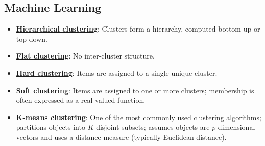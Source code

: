 \documentclass{article}%
\begin{document}
\subsection{Machine Learning}%
\label{subsec:MachineLearning}%
\begin{itemize}[leftmargin=*]%
\item \href{https://purdue.brightspace.com/d2l/common/assets/pdfjs-d2l-dist/1.0.14-legacy/web/viewer.html?file=\%2Fcontent\%2Fenforced\%2F1095465-WL.202510.CS24200.LE1\%2F17L2-distance-clusters.pdf\%3Fou\%3D1095465\&lang=en-us\&container=d2l-fileviewer-rendered-pdf\&fullscreen=d2l-fileviewer-rendered-pdf-dialog\&height=667#page=15}{\textbf{Hierarchical clustering}}: Clusters form a hierarchy, computed bottom-up or top-down.%
\item \href{https://purdue.brightspace.com/d2l/common/assets/pdfjs-d2l-dist/1.0.14-legacy/web/viewer.html?file=\%2Fcontent\%2Fenforced\%2F1095465-WL.202510.CS24200.LE1\%2F17L2-distance-clusters.pdf\%3Fou\%3D1095465\&lang=en-us\&container=d2l-fileviewer-rendered-pdf\&fullscreen=d2l-fileviewer-rendered-pdf-dialog\&height=667#page=15}{\textbf{Flat clustering}}: No inter-cluster structure.%
\item \href{https://purdue.brightspace.com/d2l/common/assets/pdfjs-d2l-dist/1.0.14-legacy/web/viewer.html?file=\%2Fcontent\%2Fenforced\%2F1095465-WL.202510.CS24200.LE1\%2F17L2-distance-clusters.pdf\%3Fou\%3D1095465\&lang=en-us\&container=d2l-fileviewer-rendered-pdf\&fullscreen=d2l-fileviewer-rendered-pdf-dialog\&height=667#page=15}{\textbf{Hard clustering}}: Items are assigned to a single unique cluster.%
\item \href{https://purdue.brightspace.com/d2l/common/assets/pdfjs-d2l-dist/1.0.14-legacy/web/viewer.html?file=\%2Fcontent\%2Fenforced\%2F1095465-WL.202510.CS24200.LE1\%2F17L2-distance-clusters.pdf\%3Fou\%3D1095465\&lang=en-us\&container=d2l-fileviewer-rendered-pdf\&fullscreen=d2l-fileviewer-rendered-pdf-dialog\&height=667#page=15}{\textbf{Soft clustering}}: Items are assigned to one or more clusters; membership is often expressed as a real-valued function.%
\item \href{https://purdue.brightspace.com/d2l/common/assets/pdfjs-d2l-dist/1.0.14-legacy/web/viewer.html?file=\%2Fcontent\%2Fenforced\%2F1095465-WL.202510.CS24200.LE1\%2F17L2-distance-clusters.pdf\%3Fou\%3D1095465\&lang=en-us\&container=d2l-fileviewer-rendered-pdf\&fullscreen=d2l-fileviewer-rendered-pdf-dialog\&height=667#page=21}{\textbf{K-means clustering}}: One of the most commonly used clustering algorithms; partitions objects into $K$ disjoint subsets; assumes objects are $p$-dimensional vectors and uses a distance measure (typically Euclidean distance).%

\end{itemize}
\end{document}
